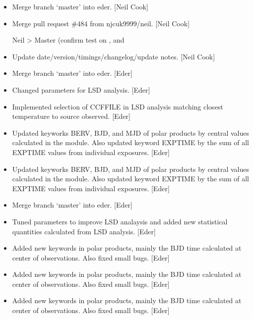 \documentclass[a4paper,10pt,english]{report}
\begin{document}
\begin{itemize}
\item {} 
Merge branch ‘master’ into eder. {[}Neil Cook{]}

\item {} 
Merge pull request \#484 from njcuk9999/neil. {[}Neil Cook{]}

Neil \textendash{}\textgreater{} Master (confirm test on ,  and 

\item {} 
Update date/version/timings/changelog/update notes. {[}Neil Cook{]}

\item {} 
Merge branch ‘master’ into eder. {[}Eder{]}

\item {} 
Changed parameters for LSD analysis. {[}Eder{]}

\item {} 
Implemented selection of CCFFILE in LSD analysis matching closest
temperature to source observed. {[}Eder{]}

\item {} 
Updated keyworks BERV, BJD, and MJD of polar products by central
values calculated in the module. Also updated keyword EXPTIME by the
sum of all EXPTIME values from individual exposures. {[}Eder{]}

\item {} 
Updated keyworks BERV, BJD, and MJD of polar products by central
values calculated in the module. Also updated keyword EXPTIME by the
sum of all EXPTIME values from individual exposures. {[}Eder{]}

\item {} 
Merge branch ‘master’ into eder. {[}Eder{]}

\item {} 
Tuned parameters to improve LSD analaysis and added new statistical
quantities calculated from LSD analysis. {[}Eder{]}

\item {} 
Added new keywords in polar products, mainly the BJD time calculated
at center of observations. Also fixed small bugs. {[}Eder{]}

\item {} 
Added new keywords in polar products, mainly the BJD time calculated
at center of observations. Also fixed small bugs. {[}Eder{]}

\item {} 
Added new keywords in polar products, mainly the BJD time calculated
at center of observations. Also fixed small bugs. {[}Eder{]}


\end{itemize}
\end{document}
